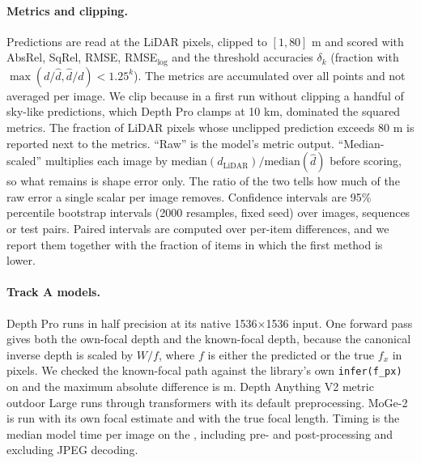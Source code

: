 \documentclass[10pt]{article}
\newcommand{\gpu}{\GPUname}
\begin{document}
\paragraph{Metrics and clipping.}
Predictions are read at the LiDAR pixels, clipped to $[1, 80]$ m and scored with AbsRel, SqRel, RMSE,
RMSE$_{\log}$ and the threshold accuracies $\delta_k$ (fraction with $\max(d/\hat d, \hat d/d) < 1.25^k$).
The metrics are accumulated over all points and not averaged per image. We clip because in a first run
without clipping a handful of sky-like predictions, which Depth Pro clamps at 10 km, dominated the squared
metrics. The fraction of LiDAR pixels whose unclipped prediction exceeds 80 m is reported next to the
metrics. ``Raw'' is the model's metric output. ``Median-scaled'' multiplies each image by
$\mathrm{median}(d_{\mathrm{LiDAR}})/\mathrm{median}(\hat d)$ before scoring, so what remains is shape
error only. The ratio of the two tells how much of the raw error a single scalar per image removes.
Confidence intervals are 95\% percentile bootstrap intervals (2000 resamples, fixed seed) over images,
sequences or test pairs. Paired intervals are computed over per-item differences, and we report them
together with the fraction of items in which the first method is lower.

\paragraph{Track A models.}
Depth Pro \citep{bochkovskii2025depthpro} runs in half precision at its native 1536$\times$1536 input.
One forward pass gives both the own-focal depth and the known-focal depth, because the canonical inverse
depth is scaled by $W/f$, where $f$ is either the predicted or the true $f_x$ in pixels. We checked the
known-focal path against the library's own \texttt{infer(f\_px)} on \FocalCheckDevice{} and the maximum
absolute difference is \FocalCheckMaxDiff{} m. Depth Anything V2 metric outdoor Large \citep{yang2024dav2}
runs through transformers with its default preprocessing. MoGe-2 \citep{wang2025moge2} is run with its own
focal estimate and with the true focal length. Timing is the median model time per image on the \gpu{},
including pre- and post-processing and excluding JPEG decoding.
\end{document}

